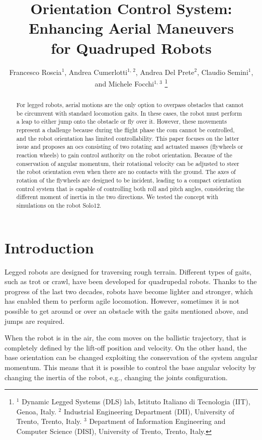 \documentclass[letterpaper, 10 pt, conference]{ieeeconf}      %
\title{Orientation Control System: Enhancing Aerial Maneuvers \\ for Quadruped Robots}
\author{
	Francesco Roscia$^{1}$, Andrea Cumerlotti$^{1, \, 2}$, Andrea Del Prete$^{2}$, Claudio Semini$^{1}$, and Michele Focchi$^{1, \, 3}$
	\thanks{$^1$ Dynamic Legged Systems (DLS) lab, Istituto Italiano di Tecnologia (IIT), Genoa, Italy.
		$^2$ Industrial Engineering Department (DII), University of Trento, Trento, Italy.
		$^3$ Department of Information Engineering and Computer Science (DISI), University of Trento, Trento, Italy.
}}
\begin{document}
\maketitle
\thispagestyle{empty}
\pagestyle{empty}

\begin{abstract}%
For legged robots, aerial motions are the only option to overpass obstacles that cannot be circumvent with standard locomotion gaits. In these cases, the robot must perform a leap to either jump onto the obstacle or fly over it. However, these movements represent a challenge because during the flight phase the \gls{com} cannot be controlled, and the robot orientation has limited controllability. This paper focuses on the latter issue and proposes an \gls{ocs} consisting of two rotating and actuated masses (flywheels or reaction wheels) to gain control authority on the robot orientation. Because of the conservation of angular momentum, their rotational velocity can be adjusted to steer the robot orientation even when there are no contacts with the ground. The axes of rotation of the flywheels are designed to be incident, leading to a compact orientation control system that is capable of controlling both roll and pitch angles, considering the different moment of inertia in the two directions. We tested the concept with simulations on the robot Solo12.
\end{abstract}

	 

\section{Introduction}\label{sec:introduction}
Legged robots are designed for traversing rough terrain.
Different types of gaits, such as trot or crawl, have been developed for quadrupedal robots. 
Thanks to the progress of the last two decades, robots have become lighter and stronger, which has enabled them to perform agile locomotion.
However, sometimes it is not possible to get around or over an obstacle with the gaits mentioned above, and jumps are required. 

When the robot is in the air, the \gls{com} moves on the ballistic trajectory, that is completely defined by the lift-off position and velocity. On the other hand, the base orientation can be changed exploiting the conservation of the system angular momentum. This means that it is possible to control the base angular velocity by changing the inertia of the robot, e.g., changing the joints configuration. 
\end{document}
